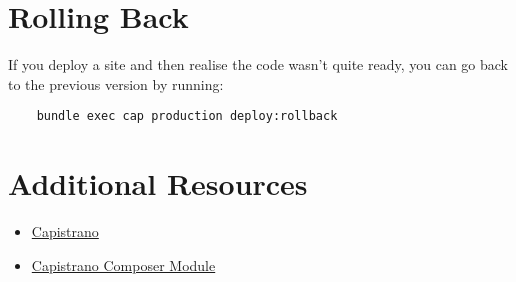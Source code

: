 \section{Rolling Back}

If you deploy a site and then realise the code wasn't quite ready, you can go back to the previous version by running:

\begin{verbatim}
    bundle exec cap production deploy:rollback
\end{verbatim}


\section{Additional Resources}

\begin{itemize}[leftmargin=*]
    \item \href{https://capistranorb.com}{Capistrano}
    \item \href{https://github.com/capistrano/composer}{Capistrano Composer Module}
\end{itemize}
